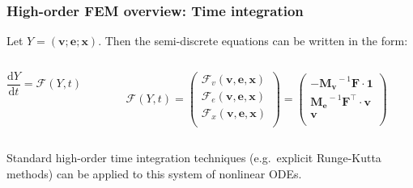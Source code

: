 \documentclass[8pt,xcolor=svgnames]{beamer}
\def\dd{\mathrm d}
\begin{document}
\begin{frame} \frametitle{High-order FEM overview: Time integration}
Let $Y = \left(\mathbf{v}; \mathbf{e}; \mathbf{x}\right)$. Then
the semi-discrete equations can be written in the form:
\vspace{-2.5mm}
\begin{columns}
\begin{column}{0.3\textwidth}
  \begin{center}
  \begin{minipage}{0.8\textwidth}
  \begin{block}{}
  \centering
  $\dfrac{\dd Y}{\dd t} = \mathcal{F}(Y, t)$
  \end{block}
  \end{minipage}
  \end{center}
\end{column}
\begin{column}{0.7\textwidth}
  \begin{center}
  \begin{minipage}{0.8\textwidth}
  \begin{alertblock}{}
  \centering
  $
    \mathcal{F}(Y, t) =
    \begin{pmatrix}
    \mathcal{F}_v(\mathbf{v}, \mathbf{e}, \mathbf{x}) \\
    \mathcal{F}_e(\mathbf{v}, \mathbf{e}, \mathbf{x}) \\
    \mathcal{F}_x(\mathbf{v}, \mathbf{e}, \mathbf{x})\\
    \end{pmatrix}
    =
    \begin{pmatrix}
    - \mathbf{M_v}^{\!\!-1} \mathbf{F}\cdot \mathbf{1} \\
    \mathbf{M_e}^{\!\!-1} \mathbf{F}^\top \cdot \mathbf{v} \\
    \mathbf{v}\\
    \end{pmatrix}
  $
  \end{alertblock}
  \end{minipage}
  \end{center}
\end{column}
\end{columns}
\medskip
Standard high-order time integration techniques (e.g.\ explicit Runge-Kutta
methods) can be applied to this system of nonlinear ODEs.


\end{frame}
\end{document}
